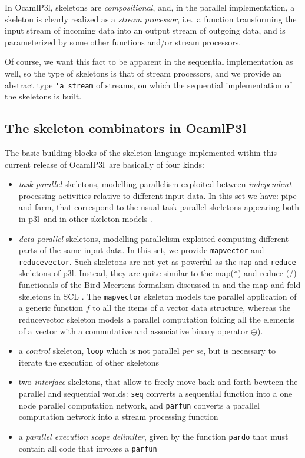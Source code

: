 \documentclass{article}
\newcommand{\ocamlpiiil}{{\sf OcamlP3l}}
\newcommand{\pppl}{{\sf p3l}}
\begin{document}
In \ocamlpiiil, skeletons are \emph{compositional}, and, in the parallel implementation, 
a  skeleton is clearly realized as a \emph{stream processor},
i.e.\  a function transforming the input stream of incoming data into an output stream of
outgoing data, and is parameterized by some other functions and/or stream processors.

Of course, we want this fact to be apparent in the sequential implementation as well,
so the type of skeletons is that of stream processors, and we provide an abstract type
\verb|'a stream| of streams, on which the sequential implementation of the skeletons is
built.

\subsection{The skeleton combinators in OcamlP3l}
The basic building blocks of the skeleton language 
implemented within this current release of \ocamlpiiil\ are basically of four kinds:
\begin{itemize}
\item \textit{task parallel} skeletons, modelling parallelism
  exploited between \textit{independent} processing activities
  relative to different input data. In this set we have: pipe
  and farm, that correspond to
  the usual task parallel skeletons appearing both in \pppl\ 
  and in other skeleton models
  \cite{cole-th,ic-parle-93-1, darli-to-1}.
\item \textit{data parallel} skeletons, modelling parallelism exploited
  computing different parts of the same input
  data. In this set, we provide \verb|mapvector| and
  \verb|reducevector|. 
  Such skeletons are not yet as powerful as the
  \verb|map| and \verb|reduce| skeletons of \pppl. Instead, they are quite similar to
  the map($*$) and reduce ($/$) functionals of the Bird-Meertens formalism
  discussed in \cite{bird1} and the \textsf{map} and \textsf{fold} skeletons in SCL
\cite{darli-to-1}. The \texttt{mapvector} skeleton models the parallel application of
a generic function $f$ to all the items of a vector data structure,
whereas the reducevector skeleton models a parallel computation folding all
the elements of a vector with a commutative and associative binary
operator $\oplus$). 
\item a \textit{control} skeleton, \verb|loop| which is not parallel \textit{per se},
      but is necessary to iterate the execution of other skeletons 

\item two \textit{interface} skeletons, that allow to freely move back and forth
      bewteen the parallel and sequential worlds: \verb|seq| converts a sequential
      function into a one node parallel computation network,
      and \verb|parfun| converts a parallel computation network into a
      stream processing function

\item a \textit{parallel execution scope delimiter}, given by the function \verb|pardo| that
      must contain all code that invokes a \verb|parfun| 
\end{itemize}
\end{document}
